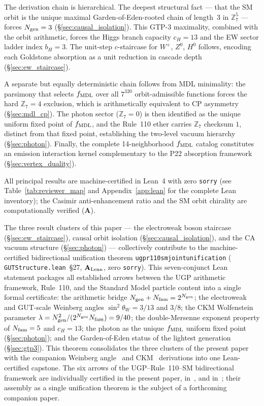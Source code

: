 \documentclass[11pt]{article}
\theoremstyle{remark}
\newcommand{\Ngen}{N_{\rm gen}}
\newcommand{\Nfam}{N_{\rm fam}}
\newcommand{\cH}{c_H}
\newcommand{\lean}[1]{%
  \penalty-100
  \begingroup\def\_{\textunderscore\allowbreak}\texttt{#1}\endgroup}
\newcommand{\sinwsq}{\sin^2\!\theta_W}
\newcommand{\CatA}{\textbf{A}}
\newcommand{\CatAL}{\ensuremath{\textbf{A}_{\rm Lean}}}
\begin{document}
The derivation chain is hierarchical.
The deepest structural fact --- that the SM orbit is the unique maximal
Garden-of-Eden-rooted chain of length~3 in $\mathbb{Z}_7^5$ --- forces
$\Ngen = 3$ (\S\ref{sec:causal_isolation}).
This GTP-3 maximality, combined with the orbit arithmetic, forces the Higgs
branch capacity $\cH = 13$ and the EW sector ladder index $b_H = 3$.
The unit-step $c$-staircase for $W^+$, $Z^0$, $H^0$ follows, encoding each
Goldstone absorption as a unit reduction in cascade depth (\S\ref{sec:ew_staircase}).

A separate but equally deterministic chain follows from MDL minimality:
the parsimony that selects $f_{\rm MDL}$ over all $7^{320}$ orbit-admissible
functions forces the hard $\mathbb{Z}_7 = 4$ exclusion, which is arithmetically
equivalent to CP asymmetry (\S\ref{sec:mdl_cp}).
The photon sector ($\mathbb{Z}_7 = 0$) is then identified as the unique uniform
fixed point of $f_{\rm MDL}$, and the Rule~110 ether carries $\mathbb{Z}_7$
checksum $1$, distinct from that fixed point, establishing the two-level
vacuum hierarchy (\S\ref{sec:photon}).
Finally, the complete 14-neighborhood $f_{\rm MDL}$ catalog constitutes an emission
interaction kernel complementary to the P22 absorption framework
(\S\ref{sec:vertex_duality}).

All principal results are machine-certified in Lean~4 with zero \texttt{sorry} (see
Table~\ref{tab:reviewer_map} and Appendix~\ref{app:lean} for the complete Lean inventory);
the Casimir anti-enhancement ratio and the SM orbit chirality are computationally verified
($\CatA$).

The three result clusters of this paper --- the electroweak boson staircase
(\S\ref{sec:ew_staircase}), causal orbit isolation (\S\ref{sec:causal_isolation}),
and the CA vacuum structure (\S\ref{sec:photon}) --- collectively contribute to the
machine-certified bidirectional unification theorem
\lean{ugp\_r110\_sm\_joint\_unification}
(\lean{GUTStructure.lean}~\S27, $\CatAL$, zero \texttt{sorry}).
This seven-conjunct Lean statement packages all established arrows between the UGP
arithmetic framework, Rule~110, and the Standard Model particle content into a single
formal certificate: the arithmetic bridge $\Ngen + \Nfam = 2^{\Ngen}$; the electroweak
and GUT-scale Weinberg angles $\sinwsq = 3/13$ and $3/8$; the CKM Wolfenstein
parameter $\lambda = \Ngen^2 / (2^{\Ngen} \Nfam) = 9/40$; the double-Mersenne exponent
property of $\Nfam = 5$ and $\cH = 13$; the photon as the unique $f_{\rm MDL}$
uniform fixed point (\S\ref{sec:photon}); and the Garden-of-Eden status of the lightest
generation (\S\ref{sec:gtp3}).
This theorem consolidates the three clusters of the present paper with the companion
Weinberg angle~\cite{SpivackWeinberg} and CKM~\cite{SpivackCKM} derivations into one
Lean-certified capstone.
The six arrows of the UGP--Rule~110--SM bidirectional framework are individually
certified in the present paper, in~\cite{SpivackWeinberg}, and in~\cite{SpivackCKM};
their assembly as a single unification theorem is the subject of a forthcoming
companion paper.
\end{document}
